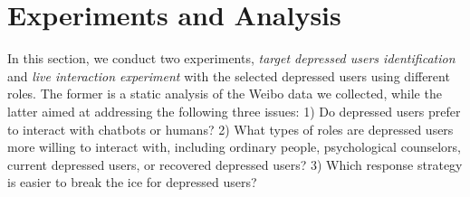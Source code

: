 
\section{Experiments and Analysis}
\label{sec:results}
In this section, we conduct two experiments, \textit{target depressed users identification} and \textit{live interaction experiment} with the selected depressed users using different roles. 
The former is a static analysis of the Weibo data we collected, while the latter aimed at addressing the following three issues: 
1) Do depressed users prefer to interact with chatbots or humans? 
2) What types of roles are depressed users more willing to interact with, 
including ordinary people, psychological counselors, current depressed users, 
or recovered depressed users? 
3) Which response strategy is easier to break the ice for depressed users?


